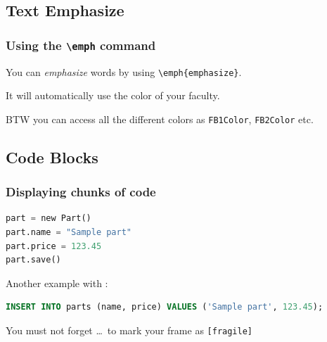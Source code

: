\documentclass[english,hangout]{beamer}
\begin{document}
\subsection{Text Emphasize}

\begin{frame}
 \frametitle{Using the \texttt{\textbackslash emph} command}
You can \emph{emphasize} words by using \texttt{\textbackslash emph\{emphasize\}}.

It will automatically use the color of your faculty.

\vspace{\baselineskip}
BTW you can access all the different colors as \texttt{FB1Color}, \texttt{FB2Color} etc.
\end{frame}



\subsection{Code Blocks}

\begin{frame}[fragile]
 \frametitle{Displaying chunks of code}

\begin{lstlisting}[language=Python]
part = new Part()
part.name = "Sample part"
part.price = 123.45
part.save()
\end{lstlisting}

Another example with :

\begin{lstlisting}[language=sql]
INSERT INTO parts (name, price) VALUES ('Sample part', 123.45);
\end{lstlisting}

\begin{alertblock}{You must not forget}
  \dots\ to mark your frame as \texttt{[fragile]}
\end{alertblock}
\end{frame}
\end{document}
